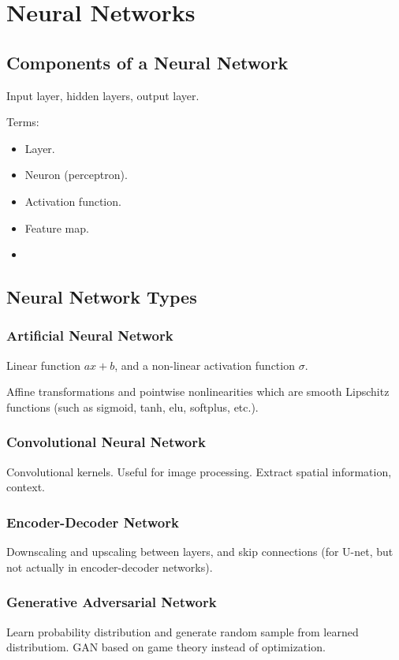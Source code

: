 \chapter{Neural Networks}
\label{sec:ml}


\section{Components of a Neural Network}
Input layer, hidden layers, output layer. 

Terms:
\begin{itemize}
    \item Layer.
    \item Neuron (perceptron).
    \item Activation function.
    \item Feature map.
    \item 
\end{itemize}

\section{Neural Network Types}


\subsection{Artificial Neural Network}
Linear function $ax+b$, and a non-linear activation function $\sigma$. 

Affine transformations and pointwise nonlinearities which are smooth Lipschitz functions (such as sigmoid, tanh, elu, softplus, etc.). 

\subsection{Convolutional Neural Network}
Convolutional kernels. Useful for image processing. Extract spatial information, context. 

\subsection{Encoder-Decoder Network}
Downscaling and upscaling between layers, and skip connections (for U-net, but not actually in encoder-decoder networks). %

\subsection{Generative Adversarial Network}
Learn probability distribution and generate random sample from learned distributiom. 
GAN based on game theory instead of optimization. 

